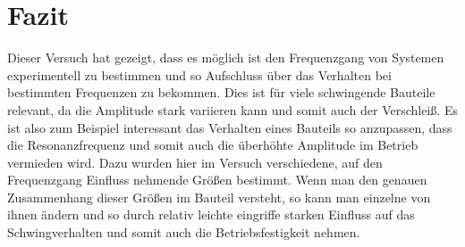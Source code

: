 \documentclass[a4paper,12pt]{scrartcl}
\begin{document}
\section{Fazit}
Dieser Versuch hat gezeigt, dass es möglich ist den Frequenzgang von Systemen experimentell zu bestimmen und so Aufschluss über das Verhalten
bei bestimmten Frequenzen zu bekommen. Dies ist für viele schwingende Bauteile relevant, da die Amplitude stark variieren kann und somit auch
der Verschleiß. Es ist also zum Beispiel interessant das Verhalten eines Bauteils so anzupassen, dass die Resonanzfrequenz und somit auch die
überhöhte Amplitude im Betrieb vermieden wird. Dazu wurden hier im Versuch verschiedene, auf den Frequenzgang Einfluss nehmende Größen bestimmt.
Wenn man den genauen Zusammenhang dieser Größen im Bauteil versteht, so kann man einzelne von ihnen ändern und so durch relativ leichte eingriffe
starken Einfluss auf das Schwingverhalten und somit auch die Betriebsfestigkeit nehmen.
\pagebreak
\nocite{*}
\printbibliography
\end{document}
